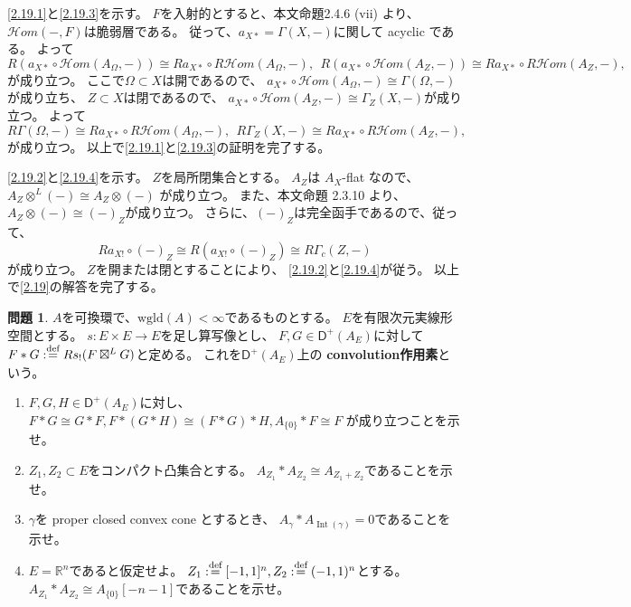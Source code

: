 \documentclass[uplatex,dvipdfmx]{jsarticle}
\makeatletter
\theoremstyle{definition}
\newtheorem{prob}[prob]{問題}
\renewenvironment{proof}[1][\proofname]{
  \pushQED{\qed}%
  \normalfont \topsep6\p@\@plus6\p@\relax
  \trivlist
  \item[\hskip\labelsep
    #1\@addpunct{\textbf{.}}]\ignorespaces
}{%
  \popQED\endtrivlist\@endpefalse
}
\providecommand{\proofname}{証明}
\newcommand{\inHom}{\mathcal{H}om}
\DeclareMathOperator{\Int}{\mathrm{Int}}
\newcommand{\sfD}{\mathsf{D}}
\newcommand\R{\mathbb{R}}
\newcommand{\wgld}{\mathrm{wgld}}
\def\dfn{:\overset{\mbox{{\scriptsize def}}}{=}}
\makeatother
\begin{document}
\begin{proof}
  \eqref{2.19.1}と\eqref{2.19.3}を示す。
  \(F\)を入射的とすると、本文命題2.4.6 (vii) より、
  \(\inHom(-,F)\)は脆弱層である。
  従って、\(a_{X*}=\Gamma(X,-)\)に関して acyclic である。
  よって
  \[
  R(a_{X*}\circ \inHom(A_{\Omega},-)) \cong Ra_{X*}\circ R\inHom(A_{\Omega},-), \ \
  R(a_{X*}\circ \inHom(A_Z,-)) \cong Ra_{X*}\circ R\inHom(A_Z,-),
  \]
  が成り立つ。
  ここで\(\Omega\subset X\)は開であるので、
  \(a_{X*}\circ \inHom(A_{\Omega},-)\cong \Gamma(\Omega,-)\)が成り立ち、
  \(Z\subset X\)は閉であるので、
  \(a_{X*}\circ \inHom(A_Z,-)\cong \Gamma_Z(X,-)\)が成り立つ。
  よって
  \[
  R\Gamma(\Omega,-) \cong Ra_{X*}\circ R\inHom(A_{\Omega},-), \ \
  R\Gamma_Z(X,-) \cong Ra_{X*}\circ R\inHom(A_Z,-),
  \]
  が成り立つ。
  以上で\eqref{2.19.1}と\eqref{2.19.3}の証明を完了する。

  \eqref{2.19.2}と\eqref{2.19.4}を示す。
  \(Z\)を局所閉集合とする。
  \(A_Z\)は \(A_X\)-flat なので、
  \(A_Z\otimes^L (-)\cong A_Z\otimes (-)\)
  が成り立つ。
  また、本文命題 2.3.10 より、
  \(A_Z\otimes (-)\cong (-)_Z\)が成り立つ。
  さらに、\((-)_Z\)は完全函手であるので、従って、
  \[Ra_{X!}\circ (-)_Z \cong R(a_{X!}\circ (-)_Z) \cong R\Gamma_c(Z,-)\]
  が成り立つ。
  \(Z\)を開または閉とすることにより、
  \eqref{2.19.2}と\eqref{2.19.4}が従う。
  以上で\autoref{2.19}の解答を完了する。
\end{proof}








\begin{prob}\label{2.20}
  \(A\)を可換環で、\(\wgld(A)<\infty\)であるものとする。
  \(E\)を有限次元実線形空間とする。
  \(s:E\times E \to E\)を足し算写像とし、
  \(F,G\in \sfD^+(A_E)\)に対して
  \(F*G \dfn Rs_!(F\boxtimes^LG)\)と定める。
  これを\(\sfD^+(A_E)\)上の
  \textbf{convolution作用素}という。
  \begin{enumerate}
    \item \label{2.20.1}
    \(F,G,H\in \sfD^+(A_E)\)に対し、
    \(F*G\cong G*F, F*(G*H)\cong (F*G)*H, A_{\{0\}}*F\cong F\)
    が成り立つことを示せ。
    \item \label{2.20.2}
    \(Z_1,Z_2\subset E\)をコンパクト凸集合とする。
    \(A_{Z_1}*A_{Z_2}\cong A_{Z_1+Z_2}\)であることを示せ。
    \item \label{2.20.3}
    \(\gamma\)を proper closed convex cone とするとき、
    \(A_{\gamma}*A_{\Int(\gamma)} = 0\)であることを示せ。
    \item \label{2.20.4}
    \(E = \R^n\)であると仮定せよ。
    \(Z_1 \dfn [-1,1]^n, Z_2\dfn (-1,1)^n\)とする。
    \(A_{Z_1}*A_{Z_2}\cong A_{\{0\}}[-n-1]\)であることを示せ。
  \end{enumerate}
\end{prob}
\end{document}
